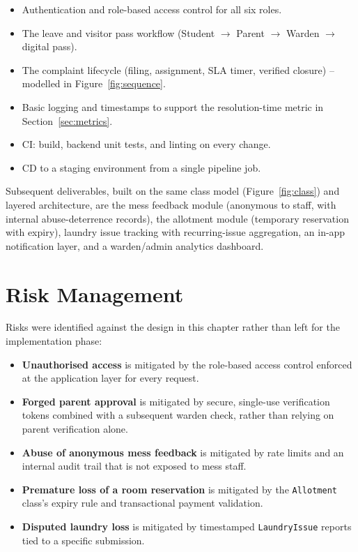 \documentclass{tietreport}
\begin{document}
\begin{itemize}
  \item Authentication and role-based access control for all six roles.
  \item The leave and visitor pass workflow (Student $\rightarrow$
    Parent $\rightarrow$ Warden $\rightarrow$ digital pass).
  \item The complaint lifecycle (filing, assignment, SLA timer, verified
    closure) -- modelled in Figure~\ref{fig:sequence}.
  \item Basic logging and timestamps to support the resolution-time
    metric in Section~\ref{sec:metrics}.
  \item CI: build, backend unit tests, and linting on every change.
  \item CD to a staging environment from a single pipeline job.
\end{itemize}

Subsequent deliverables, built on the same class model
(Figure~\ref{fig:class}) and layered architecture, are the mess feedback
module (anonymous to staff, with internal abuse-deterrence records), the
allotment module (temporary reservation with expiry), laundry issue
tracking with recurring-issue aggregation, an in-app notification layer,
and a warden/admin analytics dashboard.

\section{Risk Management}

Risks were identified against the design in this chapter rather than
left for the implementation phase:

\begin{itemize}
  \item \textbf{Unauthorised access} is mitigated by the role-based
    access control enforced at the application layer for every request.
  \item \textbf{Forged parent approval} is mitigated by secure,
    single-use verification tokens combined with a subsequent warden
    check, rather than relying on parent verification alone.
  \item \textbf{Abuse of anonymous mess feedback} is mitigated by rate
    limits and an internal audit trail that is not exposed to mess staff.
  \item \textbf{Premature loss of a room reservation} is mitigated by the
    \texttt{Allotment} class's expiry rule and transactional payment
    validation.
  \item \textbf{Disputed laundry loss} is mitigated by timestamped
    \texttt{LaundryIssue} reports tied to a specific submission.
\end{itemize}
\end{document}
